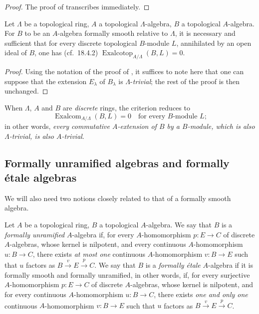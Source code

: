 \begin{proof}
The proof of  transcribes immediately.
\end{proof}

\begin{proposition}[19.9.8]
\label{0.19.9.8}
Let $\Lambda$ be a topological ring, $A$ a topological $\Lambda$-algebra, $B$ a topological $A$-algebra.
For $B$ to be an $A$-algebra formally smooth relative to $\Lambda$, it is necessary and sufficient that for every discrete topological $B$-module $L$, annihilated by an open ideal of $B$, one has (cf.\ 18.4.2) $\operatorname{Exalcotop}_{A/\Lambda}(B,L)=0$.
\end{proposition}

\begin{proof}
Using the notation of the proof of , it suffices to note here that one can suppose that the extension $E_\lambda$ of $B_\lambda$ is $\Lambda$-\emph{trivial}; the rest of the proof is then unchanged.
\end{proof}

When $\Lambda$, $A$ and $B$ are \emph{discrete} rings, the criterion  reduces to
\begin{equation}
\tag{19.9.8.1}
  \label{0.19.9.8.1}
  \operatorname{Exalcom}_{A/\Lambda}(B,L) = 0 \quad\text{for every $B$-module $L$};
\end{equation}
in other words, \emph{every commutative $A$-extension of $B$ by a $B$-module, which is also $\Lambda$-trivial, is also $A$-trivial}.

\subsection{Formally unramified algebras and formally \'{e}tale algebras}
\label{subsection:0.19.10}
\label{0.19.10}

\begin{env}[19.10.1]
\label{0.19.10.1}
We will also need two notions closely related to that of a formally smooth algebra.
\end{env}

\begin{definition}[19.10.2]
\label{0.19.10.2}
Let $A$ be a topological ring, $B$ a topological $A$-algebra.
We say that $B$ is a \emph{formally unramified} $A$-algebra if, for every $A$-homomorphism $p:E\to C$ of discrete $A$-algebras, whose kernel is nilpotent, and every continuous $A$-homomorphism $u:B\to C$, there exists \emph{at most one} continuous $A$-homomorphism $v:B\to E$ such that $u$ factors as $B\xrightarrow{v}E\xrightarrow{p}C$.
We say that $B$ is a \emph{formally \'{e}tale} $A$-algebra if it is formally smooth and formally unramified, in other words, if, for every surjective $A$-homomorphism $p:E\to C$ of discrete $A$-algebras, whose kernel is nilpotent, and for every continuous $A$-homomorphism $u:B\to C$, there exists \emph{one and only one} continuous $A$-homomorphism $v:B\to E$ such that $u$ factors as $B\xrightarrow{v}E\xrightarrow{p}C$.
\end{definition}

